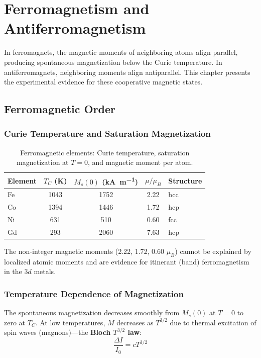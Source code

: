\chapter{Ferromagnetism and Antiferromagnetism}

In ferromagnets, the magnetic moments of neighboring atoms align parallel, producing spontaneous magnetization below the Curie temperature. In antiferromagnets, neighboring moments align antiparallel. This chapter presents the experimental evidence for these cooperative magnetic states.

\section{Ferromagnetic Order}

\subsection{Curie Temperature and Saturation Magnetization}

\begin{table}[H]
\centering
\caption{Ferromagnetic elements: Curie temperature, saturation magnetization at $T = 0$, and magnetic moment per atom.}
\label{tab:ferromagnets}
\begin{tabular}{@{}lSSSl@{}}
\toprule
Element & {$T_C$ (\si{\kelvin})} & {$M_s(0)$ (\si{\kilo\ampere\per\metre})} & {$\mu/\mu_B$} & Structure \\
\midrule
Fe  & 1043 & 1752 & 2.22 & bcc \\
Co  & 1394 & 1446 & 1.72 & hcp \\
Ni  &  631 &  510 & 0.60 & fcc \\
Gd  &  293 & 2060 & 7.63 & hcp \\
\bottomrule
\end{tabular}
\end{table}

The non-integer magnetic moments (2.22, 1.72, 0.60 $\mu_B$) cannot be explained by localized atomic moments and are evidence for itinerant (band) ferromagnetism in the 3$d$ metals.

\subsection{Temperature Dependence of Magnetization}

The spontaneous magnetization decreases smoothly from $M_s(0)$ at $T = 0$ to zero at $T_C$. At low temperatures, $M$ decreases as $T^{3/2}$ due to thermal excitation of spin waves (magnons)---the \textbf{Bloch $T^{3/2}$ law}:
\begin{equation}
  \frac{\Delta I}{I_0} = cT^{3/2}
\end{equation}

